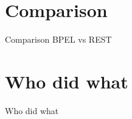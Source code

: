 

\section{Comparison}
\begin{frame}{Comparison BPEL vs REST}

\end{frame}


\section{Who did what}
\begin{frame}{Who did what}

\end{frame}


